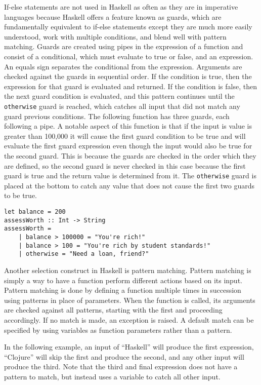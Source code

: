 \documentclass[titlepage,12pt]{article}
\begin{document}
If-else statements are not used in Haskell as often as they are in imperative languages because Haskell offers a feature 
known as guards, which are fundamentally equivalent to if-else statements except they are much more easily understood, 
work with multiple conditions, and blend well with pattern matching. Guards are created using pipes in the 
expression of a function and consist of a conditional, which must evaluate to true or false, and an expression. 
An equals sign separates the conditional from the expression. Arguments are checked against the guards in 
sequential order. If the condition is true, then the expression for that guard is evaluated and returned. 
If the condition is false, then the next guard condition is evaluated, and this pattern continues until the 
\texttt{otherwise} guard is reached, which catches all input that did not match any guard previous conditions. The 
following function has three guards, each following a pipe. A notable aspect of this function is that if the 
input is value is greater than 100,000 it will cause the first guard condition to be true and will evaluate the 
first guard expression even though the input would also be true for the second guard. This is because the guards are 
checked in the order which they are defined, so the second guard is never checked in this case because the first guard is true and the return value is 
determined from it. The \texttt{otherwise} guard is placed at the bottom to catch any value that does not cause the first two guards to be true. 

\begin{verbatim}
let balance = 200
assessWorth :: Int -> String
assessWorth =
    | balance > 100000 = "You're rich!"
    | balance > 100 = "You're rich by student standards!"
    | otherwise = "Need a loan, friend?"
\end{verbatim}

Another selection construct in Haskell is pattern matching. Pattern matching is simply a way to have a 
function perform different actions based on its input. Pattern matching is done by defining a function multiple times in 
succession using patterns in place of parameters.  When the function is called, its arguments are checked against all patterns,
starting with the first and proceeding accordingly.  If no match is made, an exception is raised.
A default match can be specified by using variables as function parameters rather than a pattern.

In the following example, an input of ``Haskell'' will produce the first expression, ``Clojure'' will skip the first 
and produce the second, and any other input will produce the third. Note that the third and final expression does 
not have a pattern to match, but instead uses a variable to catch all other input. 
\end{document}
